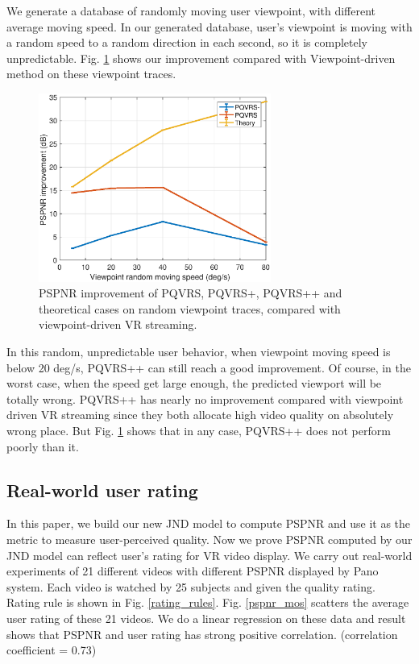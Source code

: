 We generate a database of randomly moving user viewpoint, with different average moving speed. In our generated database, user's viewpoint is moving with a random speed to a random direction in each second, so it is completely unpredictable. Fig. \ref{random_improvement} shows our improvement compared with Viewpoint-driven method on these viewpoint traces.

    \begin{figure}
  \centering
  \includegraphics[width=3in]{images/random_improvement.eps}
  \caption{PSPNR improvement of PQVRS, PQVRS+, PQVRS++ and theoretical cases on random viewpoint traces, compared with viewpoint-driven VR streaming.}
  \label{random_improvement}
  \end{figure}

In this random, unpredictable user behavior, when viewpoint moving speed is below 20 deg/s, PQVRS++ can still reach a good improvement. Of course, in the worst case, when the speed get large enough, the predicted viewport will be totally wrong. PQVRS++ has nearly no improvement compared with viewpoint driven VR streaming since they both allocate high video quality on absolutely wrong place. But Fig. \ref{random_improvement} shows that in any case, PQVRS++ does not perform poorly than it.

\subsection{Real-world user rating}

In this paper, we build our new JND model to compute PSPNR and use it as the metric to measure user-perceived quality. Now we prove PSPNR computed by our JND model can reflect user's rating for VR video display. We carry out real-world experiments of 21 different videos with different PSPNR displayed by Pano system. Each video is watched by 25 subjects and given the quality rating. Rating rule is shown in Fig. \ref{rating_rules}. Fig. \ref{pspnr_mos} scatters the average user rating of these 21 videos. We do a linear regression on these data and result shows that PSPNR and user rating has strong positive correlation. (correlation coefficient = 0.73)

